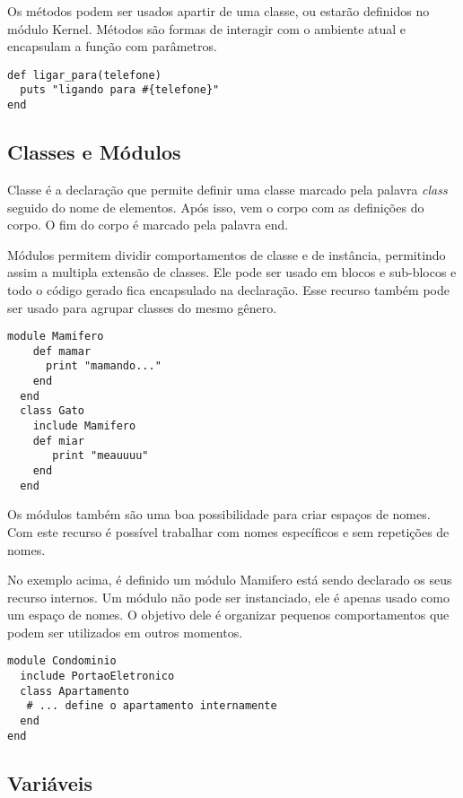 \documentclass[12pt]{article}
\begin{document}
Os métodos podem ser usados apartir de uma classe, ou estarão definidos no módulo Kernel. Métodos são formas de interagir com o ambiente atual e encapsulam a função com parâmetros.

\begin{lstlisting}[caption=Exemplo de método ]
def ligar_para(telefone)
  puts "ligando para #{telefone}"
end
\end{lstlisting}

\subsection { Classes e Módulos }
 
Classe é a declaração que permite definir uma classe marcado pela palavra \textit{class} seguido do nome de elementos. Após isso, vem o corpo com as definições do corpo. O fim do corpo é marcado pela palavra end.

Módulos permitem dividir comportamentos de classe e de instância, permitindo assim a multipla extensão de classes. Ele pode ser usado em blocos e sub-blocos e todo o código gerado fica encapsulado na declaração. Esse recurso também pode ser usado para agrupar classes do mesmo gênero. 

\begin{lstlisting}[caption=Exemplo de módulo ]
  module Mamifero
    def mamar
      print "mamando..."
    end
  end
  class Gato
    include Mamifero
    def miar
       print "meauuuu"
    end
  end
\end{lstlisting}

Os módulos também são uma boa possibilidade para criar espaços de nomes. Com este recurso é possível trabalhar com nomes específicos e sem repetições de nomes.

No exemplo acima, é definido um módulo Mamifero está sendo declarado os seus recurso internos. Um módulo não pode ser instanciado, ele é apenas usado como um espaço de nomes. O objetivo dele é organizar pequenos comportamentos que podem ser utilizados em outros momentos.

\begin{lstlisting}[caption=Exemplo de módulo como espaço ]
module Condominio
  include PortaoEletronico
  class Apartamento
   # ... define o apartamento internamente
  end
end 
\end{lstlisting}

\subsection{ Variáveis } 
\end{document}
